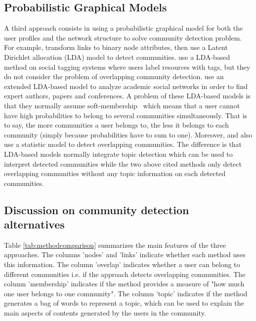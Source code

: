 \subsection{Probabilistic Graphical Models}
A third approach consists in using a probabilistic graphical model for both the user profiles and the network structure to solve community detection problem. For example, \cite{DBLP:conf/isi/ZhangQGFY07} transform links to binary node attributes, then use a Latent Dirichlet allocation (LDA) model to detect communities. \cite{journals/jasis/SunL13} use a LDA-based method on social tagging systems where users label resources with tags, but they do not consider the problem of overlapping community detection.  \cite{tang2008arnetminer} use an extended LDA-based model to analyze academic social networks in order to find expert authors, papers and conferences. A problem of these LDA-based models is that they normally assume soft-membership~\cite{yang2013community} which means that a user cannot have high probabilities to belong to several communities simultaneously. That is to say, the more communities a user belongs to, the less it belongs to each community (simply because probabilities have to sum to one). 
Moreover, \cite{mcdaid2010detecting} and \cite{lancichinetti2011finding} also use a statistic model to detect overlapping communities. The difference is that LDA-based models normally integrate topic detection which can be used to interpret detected communities while the two above cited methods only detect overlapping communities without any topic information on each detected communities.

\subsection{Discussion on community detection alternatives}
Table \ref{tab:methodcomparison} summarizes the main features of the three approaches. 
The columns 'nodes' and 'links' indicate whether each method uses this information.  
The column 'overlap' indicates whether a user can belong to different communities i.e. if the approach detects overlapping communities.  
The column 'membership' indicates if the method provides a measure of "how much one user belongs to one community". 
The column 'topic' indicates if the method generates a bag of words to represent a topic, which can be used to explain the main aspects of contents generated by the users in the community.


